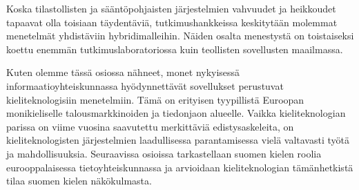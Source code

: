 \begin{multicols}{2}
Koska tilastollisten ja sääntöpohjaisten järjestelmien vahvuudet ja heikkoudet tapaavat olla toisiaan täydentäviä, tutkimushankkeissa keskitytään molemmat menetelmät yhdistäviin hybridimalleihin. Näiden osalta menestystä on toistaiseksi koettu enemmän tutkimuslaboratoriossa kuin teollisten sovellusten maailmassa.

Kuten olemme tässä osiossa nähneet, monet nykyisessä informaatioyhteiskunnassa hyödynnettävät sovellukset perustuvat kieliteknologisiin menetelmiin. Tämä on erityisen tyypillistä Euroopan monikieliselle talousmarkkinoiden ja tiedonjaon alueelle. Vaikka kieliteknologian parissa on viime vuosina saavutettu merkittäviä edistysaskeleita, on kieliteknologisten järjestelmien laadullisessa parantamisessa vielä valtavasti työtä ja mahdollisuuksia. Seuraavissa osioissa tarkastellaan suomen kielen roolia eurooppalaisessa tietoyhteiskunnassa ja arvioidaan kieliteknologian tämänhetkistä tilaa suomen kielen näkökulmasta.
\end{multicols}

\clearpage
{}

